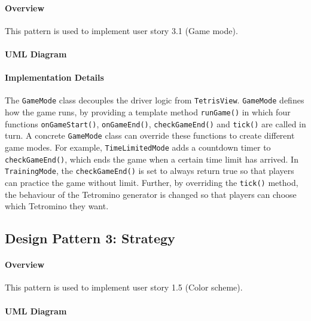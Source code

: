 \documentclass{article}
\begin{document}
\paragraph{Overview}
This pattern is used to implement user story 3.1 (Game mode).

\paragraph{UML Diagram}\hfill

\begin{figure}[H]
    
\end{figure}

\paragraph{Implementation Details}

The \verb`GameMode` class decouples the driver logic from \verb`TetrisView`. \verb`GameMode` defines how the game runs, by providing a template method \verb`runGame()` in which four functions \verb`onGameStart()`, \verb`onGameEnd()`, \verb`checkGameEnd()` and \verb`tick()` are called in turn. A concrete \verb`GameMode` class can override these functions to create different game modes. For example, \verb`TimeLimitedMode` adds a countdown timer to \verb`checkGameEnd()`, which ends the game when a certain time limit has arrived. In \verb`TrainingMode`, the \verb`checkGameEnd()` is set to always return true so that players can practice the game without limit. Further, by overriding the \verb`tick()` method, the behaviour of the Tetromino generator is changed so that players can choose which Tetromino they want.

\clearpage

\subsection{Design Pattern 3: Strategy}

\paragraph{Overview}
This pattern is used to implement user story 1.5 (Color scheme).

\paragraph{UML Diagram}\hfill
\end{document}
